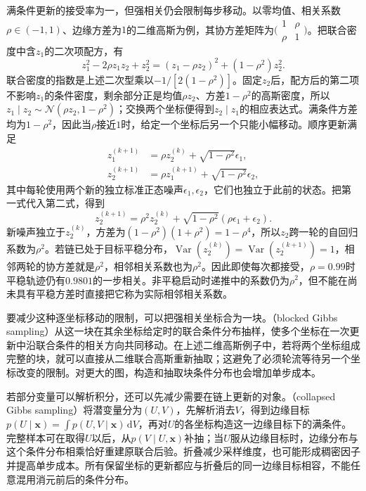 满条件更新的接受率为一，但强相关仍会限制每步移动。以零均值、相关系数$\rho\in(-1,1)$、边缘方差为$1$的二维高斯为例，其协方差矩阵为$\bigl(\begin{smallmatrix}1&\rho\\\rho&1\end{smallmatrix}\bigr)$。把联合密度中含$z_1$的二次项配方，有
\[
  z_1^2-2\rho z_1z_2+z_2^2
    =(z_1-\rho z_2)^2+(1-\rho^2)z_2^2.
\]
联合密度的指数是上述二次型乘以$-1/[2(1-\rho^2)]$。固定$z_2$后，配方后的第二项不影响$z_1$的条件密度，剩余部分正是均值$\rho z_2$、方差$1-\rho^2$的高斯密度，所以$z_1\mid z_2\sim\mathcal{N}(\rho z_2,1-\rho^2)$；交换两个坐标便得到$z_2\mid z_1$的相应表达式。满条件方差均为$1-\rho^2$，因此当$\rho$接近$1$时，给定一个坐标后另一个只能小幅移动。顺序更新满足
\[
  \begin{aligned}
    z_1^{(k+1)}&=\rho z_2^{(k)}+\sqrt{1-\rho^2}\epsilon_1,\\
    z_2^{(k+1)}&=\rho z_1^{(k+1)}+\sqrt{1-\rho^2}\epsilon_2,
  \end{aligned}
\]
其中每轮使用两个新的独立标准正态噪声$\epsilon_1,\epsilon_2$，它们也独立于此前的状态。把第一式代入第二式，得到
\[
  z_2^{(k+1)}
    =\rho^2z_2^{(k)}
      +\sqrt{1-\rho^2}(\rho\epsilon_1+\epsilon_2).
\]
新噪声独立于$z_2^{(k)}$，方差为$(1-\rho^2)(1+\rho^2)=1-\rho^4$，所以$z_2$跨一轮的自回归系数为$\rho^2$。若链已处于目标平稳分布，$\operatorname{Var}(z_2^{(k)})=\operatorname{Var}(z_2^{(k+1)})=1$，相邻两轮的协方差就是$\rho^2$，相邻相关系数也为$\rho^2$。因此即使每次都接受，$\rho=0.99$时平稳轨迹仍有$0.9801$的一步相关。非平稳启动时递推中的系数仍为$\rho^2$，但不能在尚未具有平稳方差时直接把它称为实际相邻相关系数。

要减少这种逐坐标移动的限制，可以把强相关坐标合为一块。（blocked Gibbs sampling）从这一块在其余坐标给定时的联合条件分布抽样，使多个坐标在一次更新中沿联合条件的相关方向共同移动。在上述二维高斯例子中，若将两个坐标组成完整的块，就可以直接从二维联合高斯重新抽取；这避免了必须轮流等待另一个坐标改变的限制。对更大的图，构造和抽取块条件分布也会增加单步成本。

若部分变量可以解析积分，还可以先减少需要在链上更新的对象。（collapsed Gibbs sampling）将潜变量分为$(U,V)$，先解析消去$V$，得到边缘目标$p(U\mid\bm{x})=\int p(U,V\mid\bm{x})\,\mathrm{d}V$，再对$U$的各坐标构造这一边缘目标下的满条件。完整样本可在取得$U$以后，从$p(V\mid U,\bm{x})$补抽；当$U$服从边缘目标时，边缘分布与这个条件分布相乘恰好重建原联合后验。折叠减少采样维度，也可能形成稠密因子并提高单步成本。所有保留坐标的更新都应与折叠后的同一边缘目标相容，不能任意混用消元前后的条件分布。

